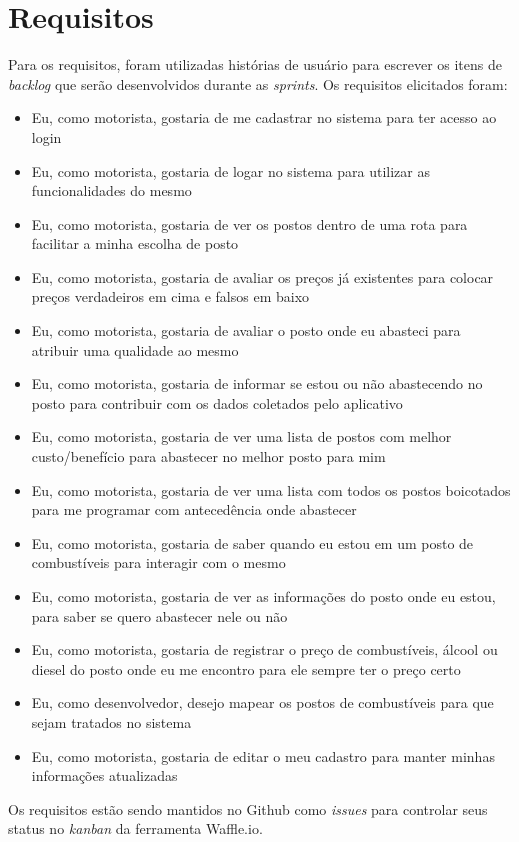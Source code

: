 \section{Requisitos}

Para os requisitos, foram utilizadas histórias de usuário para escrever os itens de \textit{backlog} que serão desenvolvidos durante as \textit{sprints}. Os requisitos elicitados foram:
\begin{itemize}
    \item Eu, como motorista, gostaria de me cadastrar no sistema para ter acesso ao login
    \item Eu, como motorista, gostaria de logar no sistema para utilizar as funcionalidades do mesmo
    \item Eu, como motorista, gostaria de ver os postos dentro de uma rota para facilitar a minha escolha de posto
    \item Eu, como motorista, gostaria de avaliar os preços já existentes para colocar preços verdadeiros em cima e falsos em baixo
    \item Eu, como motorista, gostaria de avaliar o posto onde eu abasteci para atribuir uma qualidade ao mesmo
    \item Eu, como motorista, gostaria de informar se estou ou não abastecendo no posto para contribuir com os dados coletados pelo aplicativo
    \item Eu, como motorista, gostaria de ver uma lista de postos com melhor custo/benefício para abastecer no melhor posto para mim
    \item Eu, como motorista, gostaria de ver uma lista com todos os postos boicotados para me programar com antecedência onde abastecer
    \item Eu, como motorista, gostaria de saber quando eu estou em um posto de combustíveis para interagir com o mesmo
    \item Eu, como motorista, gostaria de ver as informações do posto onde eu estou, para saber se quero abastecer nele ou não
    \item Eu, como motorista, gostaria de registrar o preço de combustíveis, álcool ou diesel do posto onde eu me encontro para ele sempre ter o preço certo
    \item Eu, como desenvolvedor, desejo mapear os postos de combustíveis para que sejam tratados no sistema
    \item Eu, como motorista, gostaria de editar o meu cadastro para manter minhas informações atualizadas
\end{itemize}
Os requisitos estão sendo mantidos no Github como \textit{issues} para controlar seus status no \textit{kanban} da ferramenta Waffle.io.
